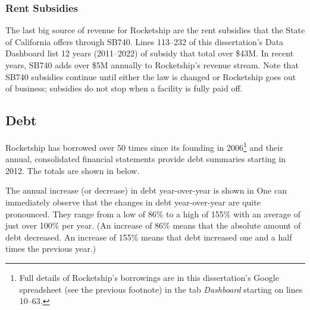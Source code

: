 \subsubsection{Rent Subsidies}%
\label{sec:rent-subsidies}\indent%

The last big source of revenue for Rocketship are the rent subsidies that the State of California offers through SB740. Lines 113–232 of this dissertation's Data Dashboard list 12 years (2011–2022) of subsidy that total over \$43M. In recent years, SB740 adds over \$5M annually to Rocketship's revenue stream. Note that SB740 subsidies continue until either the law is changed or Rocketship goes out of business; subsidies do not stop when a facility is fully paid off.

\subsection{Debt}%
\label{sec:debt}\indent%

Rocketship has borrowed over 50 times since its founding in 2006\footnote{Full details of Rocketship's borrowings are in this dissertation's Google spreadsheet (see the previous footnote) in the tab \textit{Dashboard} starting on lines 10–63.} 
and their annual, consolidated financial statements provide debt summaries starting in 2012. The totals are shown in  below.

The annual increase (or decrease) in debt year-over-year is shown in  One can immediately observe that the changes in debt year-over-year are quite pronounced. They range from a low of 86\% to a high of 155\% with an average of just over 100\% per year. (An increase of 86\% means that the absolute amount of debt decreased. An increase of 155\% means that debt increased one and a half times the previous year.)

